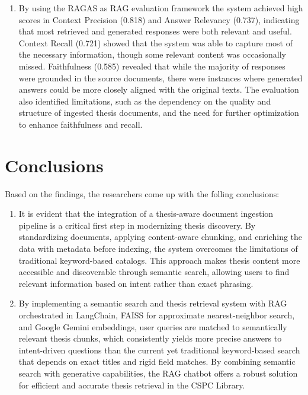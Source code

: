 \begin{refsection}
\begin{enumerate}
    \item By using the RAGAS as RAG evaluation framework the  system achieved high scores in Context Precision (0.818) and Answer Relevancy (0.737), indicating that most retrieved and generated responses were both relevant and useful. Context Recall (0.721) showed that the system was able to capture most of the necessary information, though some relevant content was occasionally missed. Faithfulness (0.585) revealed that while the majority of responses were grounded in the source documents, there were instances where generated answers could be more closely aligned with the original texts. The evaluation also identified limitations, such as the dependency on the quality and structure of ingested thesis documents, and the need for further optimization to enhance faithfulness and recall. 
\end{enumerate}

\section*{Conclusions}

    Based on the findings, the researchers come up with the folling conclusions:

\begin{enumerate}
    \item It is evident that the integration of a thesis-aware document ingestion pipeline is a critical first step in modernizing thesis discovery. By standardizing documents, applying content-aware chunking, and enriching the data with metadata before indexing, the system overcomes the limitations of traditional keyword-based catalogs. This approach makes thesis content more accessible and discoverable through semantic search, allowing users to find relevant information based on intent rather than exact phrasing.

    \item By implementing a semantic search and thesis retrieval system with RAG orchestrated in LangChain, FAISS for approximate nearest-neighbor search, and Google Gemini embeddings, user queries are matched to semantically relevant thesis chunks, which consistently yields more precise answers to intent-driven questions than the current yet traditional keyword-based search that depends on exact titles and rigid field matches. By combining semantic search with generative capabilities, the RAG chatbot offers a robust solution for efficient and accurate thesis retrieval in the CSPC Library.


\end{enumerate}
\end{refsection}
